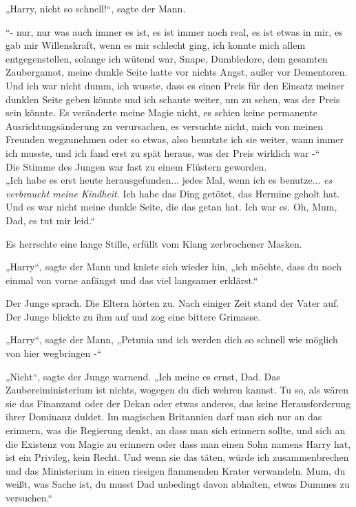 {„Harry, nicht so schnell!“, sagte der Mann.

“- nur, nur was auch immer es ist, es ist immer noch real, es ist etwas in mir, es gab mir Willenskraft, wenn es mir schlecht ging, ich konnte mich allem entgegenstellen, solange ich wütend war, Snape, Dumbledore, dem gesamten Zaubergamot, meine dunkle Seite hatte vor nichts Angst, außer vor Dementoren. Und ich war nicht dumm, ich wusste, dass es einen Preis für den Einsatz meiner dunklen Seite geben könnte und ich schaute weiter, um zu sehen, was der Preis sein könnte. Es veränderte meine Magie nicht, es schien keine permanente Ausrichtungsänderung zu verursachen, es versuchte nicht, mich von meinen Freunden wegzunehmen oder so etwas, also benutzte ich sie weiter, wann immer ich musste, und ich fand erst zu spät heraus, was der Preis wirklich war -“\\ Die Stimme des Jungen war fast zu einem Flüstern geworden.\\ „Ich habe es erst heute herausgefunden... jedes Mal, wenn ich es benutze... \emph{es verbraucht meine Kindheit}. Ich habe das Ding getötet, das Hermine geholt hat. Und es war nicht meine dunkle Seite, die das getan hat. Ich war es. Oh, Mum, Dad, es tut mir leid.“

Es herrschte eine lange Stille, erfüllt vom Klang zerbrochener Masken.

„Harry“, sagte der Mann und kniete sich wieder hin, „ich möchte, dass du noch einmal von vorne anfängst und das viel langsamer erklärst.“

Der Junge sprach. Die Eltern hörten zu. Nach einiger Zeit stand der Vater auf. Der Junge blickte zu ihm auf und zog eine bittere Grimasse.

„Harry“, sagte der Mann, „Petunia und ich werden dich so schnell wie möglich von hier wegbringen -“

„Nicht“, sagte der Junge warnend. „Ich meine es ernst, Dad. Das Zaubereiministerium ist nichts, wogegen du dich wehren kannst. Tu so, als wären sie das Finanzamt oder der Dekan oder etwas anderes, das keine Herausforderung ihrer Dominanz duldet. Im magischen Britannien darf man sich nur an das erinnern, was die Regierung denkt, an dass man sich erinnern sollte, und sich an die Existenz von Magie zu erinnern oder dass man einen Sohn namens Harry hat, ist ein Privileg, kein Recht. Und wenn sie das täten, würde ich zusammenbrechen und das Ministerium in einen riesigen flammenden Krater verwandeln. Mum, du weißt, was Sache ist, du musst Dad unbedingt davon abhalten, etwas Dummes zu versuchen.“

}
